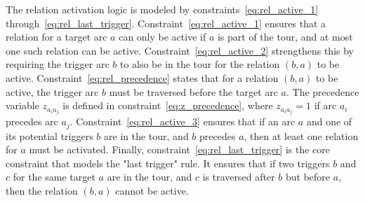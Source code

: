 \documentclass[twocolumn, switch]{article} %
\begin{document}
The relation activation logic is modeled by constraints~\eqref{eq:rel_active_1} through~\eqref{eq:rel_last_trigger}.
Constraint~\eqref{eq:rel_active_1} ensures that a relation for a target arc $a$ can only be active if $a$ is part of the tour, and at most one such relation can be active.
Constraint~\eqref{eq:rel_active_2} strengthens this by requiring the trigger arc $b$ to also be in the tour for the relation $(b,a)$ to be active.
Constraint~\eqref{eq:rel_precedence} states that for a relation $(b,a)$ to be active, the trigger arc $b$ must be traversed before the target arc $a$.
The precedence variable $z_{a_ia_j}$ is defined in constraint~\eqref{eq:z_precedence}, where $z_{a_ia_j}=1$ if arc $a_i$ precedes arc $a_j$.
Constraint~\eqref{eq:rel_active_3} ensures that if an arc $a$ and one of its potential triggers $b$ are in the tour, and $b$ precedes $a$, then at least one relation for $a$ must be activated.
Finally, constraint~\eqref{eq:rel_last_trigger} is the core constraint that models the "last trigger" rule. It ensures that if two triggers $b$ and $c$ for the same target $a$ are in the tour, and $c$ is traversed after $b$ but before $a$, then the relation $(b,a)$ cannot be active.

\normalsize

\end{document}
